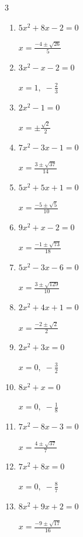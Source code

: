 \begin{multicols}{3}
\begin{enumerate}
  \item $5x^{2}+8x-2=0$

        $\displaystyle x=\frac{-4\pm \sqrt{26}}{5}$

\columnbreak %

  \item $3x^{2}-x-2=0$

        $\displaystyle x=1, \; -\frac{2}{3}$

  \item $2x^{2}-1=0$

        $\displaystyle x=\pm \frac{\sqrt{2}}{2}$

  \item $7x^{2}-3x-1=0$

        $\displaystyle x=\frac{3\pm \sqrt{37}}{14}$

  \item $5x^{2}+5x+1=0$

        $\displaystyle x=\frac{-5\pm \sqrt{5}}{10}$

  \item $9x^{2}+x-2=0$

        $\displaystyle x=\frac{-1\pm \sqrt{73}}{18}$

  \item $5x^{2}-3x-6=0$

        $\displaystyle x=\frac{3\pm \sqrt{129}}{10}$

  \item $2x^{2}+4x+1=0$

        $\displaystyle x=\frac{-2\pm \sqrt{2}}{2}$

\columnbreak %

  \item $2x^{2}+3x=0$

        $\displaystyle x=0, \; -\frac{3}{2}$

  \item $8x^{2}+x=0$

        $\displaystyle x=0, \; -\frac{1}{8}$

  \item $7x^{2}-8x-3=0$

        $\displaystyle x=\frac{4\pm \sqrt{37}}{7}$

  \item $7x^{2}+8x=0$

        $\displaystyle x=0, \; -\frac{8}{7}$

  \item $8x^{2}+9x+2=0$

        $\displaystyle x=\frac{-9\pm \sqrt{17}}{16}$


\end{enumerate}
\end{multicols}

